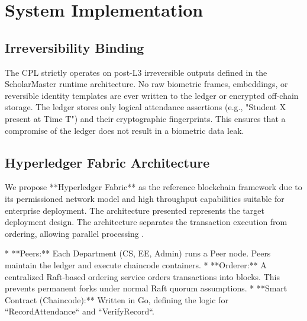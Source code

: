 \documentclass[conference]{IEEEtran}
\begin{document}
\section{System Implementation}
\begin{center}
\end{center}

\subsection{Irreversibility Binding}
The CPL strictly operates on post-L3 irreversible outputs defined in the ScholarMaster runtime architecture. No raw biometric frames, embeddings, or reversible identity templates are ever written to the ledger or encrypted off-chain storage. The ledger stores only logical attendance assertions (e.g., "Student X present at Time T") and their cryptographic fingerprints. This ensures that a compromise of the ledger does not result in a biometric data leak.

\subsection{Hyperledger Fabric Architecture}
We propose **Hyperledger Fabric** as the reference blockchain framework due to its permissioned network model and high throughput capabilities suitable for enterprise deployment. The architecture presented represents the target deployment design. The architecture separates the transaction execution from ordering, allowing parallel processing \cite{b14}.



* **Peers:** Each Department (CS, EE, Admin) runs a Peer node. Peers maintain the ledger and execute chaincode containers.
* **Orderer:** A centralized Raft-based ordering service orders transactions into blocks. This prevents permanent forks under normal Raft quorum assumptions.
* **Smart Contract (Chaincode):** Written in Go, defining the logic for ``RecordAttendance`` and ``VerifyRecord``.
\end{document}

